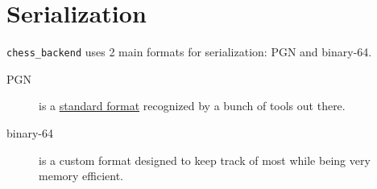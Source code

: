 \section{Serialization}
\label{serialization}

\texttt{chess\_backend} uses 2 main formats for serialization: PGN and binary-64.

\begin{description}
    \item[PGN] is a \href{http://www.saremba.de/chessgml/standards/pgn/pgn-complete.htm}{standard format} recognized by a bunch of tools out there.
    \item[binary-64] is a custom format designed to keep track of most while being very memory efficient.
\end{description}

